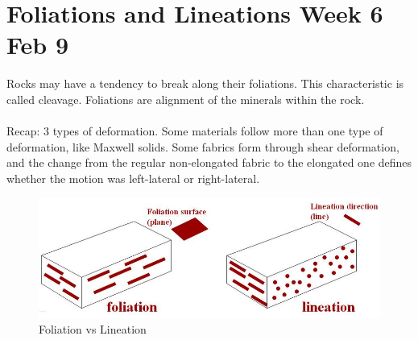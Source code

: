 \documentclass[12pt,a4paper]{report}
\begin{document}
\section*{Foliations and Lineations Week 6 Feb 9}
Rocks may have a tendency to break along their foliations.
This characteristic is called cleavage.
Foliations are alignment of the minerals within the rock.\\
\\
Recap: 3 types of deformation.
Some materials follow more than one type of deformation, like Maxwell solids.
Some fabrics form through shear deformation, and the change from the regular non-elongated fabric to the elongated one defines whether the motion was left-lateral or right-lateral.
\begin{figure}[h]
  \includegraphics[scale=0.40]{foliation-vs-lineation.jpg}
  \centering
  \caption{Foliation vs Lineation}
\end{figure}
\end{document}
